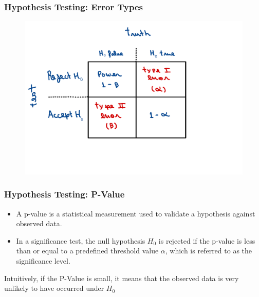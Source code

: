 \begin{frame}
    \frametitle{Hypothesis Testing: Error Types}
    \begin{figure}
        \centering
        \includegraphics[width=1\textwidth]{slides/figures/error_table.pdf}
    \end{figure}
\end{frame}

\begin{frame}
    \frametitle{Hypothesis Testing: P-Value}
    
 

    \begin{definition}

    \begin{itemize}
        \item A p-value is a statistical measurement used to validate a hypothesis against observed data.

        \item In a significance test, the null hypothesis $H_{0}$ is rejected if the p-value 
        is less than or equal to a predefined threshold value $\alpha$, which is referred to 
        as the significance level.
    \end{itemize}
    
    \end{definition}
    
    Intuitively, if the P-Value is small, it means that the observed data is very unlikely to have occurred under $H_0$
\end{frame}



